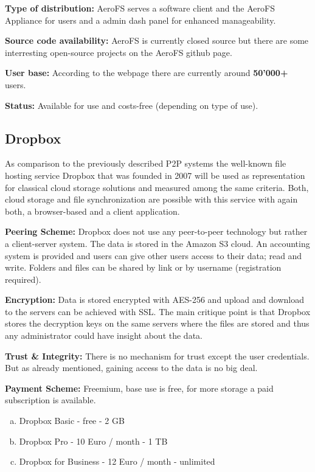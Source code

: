 \textbf{Type of distribution:} AeroFS serves a software client and the AeroFS Appliance for users and a admin dash panel for enhanced manageability.

\textbf{Source code availability:} AeroFS is currently closed source but there are some interresting open-source projects on the AeroFS github page.

\textbf{User base:} According to the webpage \cite{aerofs} there are currently around \textbf{50'000\textsc{+}} users.

\textbf{Status:} Available for use and costs-free (depending on type of use).

\subsection{Dropbox}
As comparison to the previously described P2P systems the well-known file hosting service Dropbox that was founded in 2007 will be used as representation for classical cloud storage solutions and measured among the same criteria. Both, cloud storage and file synchronization are possible with this service with again both, a browser-based and a client application.

\textbf{Peering Scheme:} Dropbox does not use any peer-to-peer technology but rather a client-server system. The data is stored in the Amazon S3 cloud. An accounting system is provided and users can give other users access to their data; read and write. Folders and files can be shared by link or by username (registration required).

\textbf{Encryption:} Data is stored encrypted with AES-256 and upload and download to the servers can be achieved with SSL. The main critique point is that Dropbox stores the decryption keys on the same servers where the files are stored and thus any administrator could have insight about the data.

\textbf{Trust \& Integrity:} There is no mechanism for trust except the user credentials. But as already mentioned, gaining access to the data is no big deal.

\textbf{Payment Scheme:} Freemium, base use is free, for more storage a paid subscription is available.
\begin{enumerate}[(a)]
	\item Dropbox Basic - free - 2 GB
	\item Dropbox Pro - 10 Euro / month - 1 TB
	\item Dropbox for Business - 12 Euro / month - unlimited
\end{enumerate}

